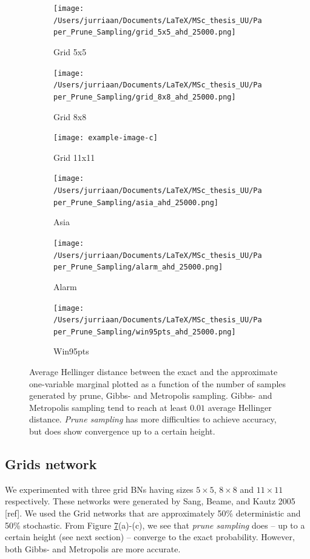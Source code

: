 \documentclass[a4paper, twoside, 11pt]{report}
\theoremstyle{plain}
\theoremstyle{definition}
\theoremstyle{remark}
\begin{document}
\begin{figure}[h!]
\centering
\begin{subfigure}{0.5\textwidth}
\texttt{[image: /Users/jurriaan/Documents/LaTeX/MSc\_thesis\_UU/Paper\_Prune\_Sampling/grid\_5x5\_ahd\_25000.png]}
\caption{Grid 5x5}%
\label{grid_5x5}%
\end{subfigure}\hfill%
\begin{subfigure}{0.5\textwidth}
\texttt{[image: /Users/jurriaan/Documents/LaTeX/MSc\_thesis\_UU/Paper\_Prune\_Sampling/grid\_8x8\_ahd\_25000.png]}
\caption{Grid 8x8}%
\label{grid_8x8}%
\end{subfigure}\hfill%

\begin{subfigure}{0.5\textwidth}
\texttt{[image: example-image-c]}
\caption{Grid 11x11}%
\label{grid_11x11}%
\end{subfigure}\hfill%
\begin{subfigure}{0.5\textwidth}
\texttt{[image: /Users/jurriaan/Documents/LaTeX/MSc\_thesis\_UU/Paper\_Prune\_Sampling/asia\_ahd\_25000.png]}
\caption{Asia}%
\label{asia}%
\end{subfigure}\hfill%

\begin{subfigure}{0.5\textwidth}
\texttt{[image: /Users/jurriaan/Documents/LaTeX/MSc\_thesis\_UU/Paper\_Prune\_Sampling/alarm\_ahd\_25000.png]}
\caption{Alarm}%
\label{alarm}%
\end{subfigure}\hfill%
\begin{subfigure}{0.5\textwidth}
\texttt{[image: /Users/jurriaan/Documents/LaTeX/MSc\_thesis\_UU/Paper\_Prune\_Sampling/win95pts\_ahd\_25000.png]}
\caption{Win95pts}%
\label{win95pts}%
\end{subfigure}\hfill%
\vspace{0.75pc}
\caption{Average Hellinger distance between the exact and the approximate one-variable marginal plotted as a function of the number of samples generated by prune, Gibbs- and Metropolis sampling. Gibbs- and Metropolis sampling tend to reach at least $0.01$ average Hellinger distance. \textit{Prune sampling} has more difficulties to achieve accuracy, but does show convergence up to a certain height. }
\label{results1}
\end{figure}



\subsection{Grids network}
We experimented with three grid BNs having sizes $5 \times 5$, $8 \times 8$ and $11 \times 11$ respectively. These networks were generated by Sang, Beame, and Kautz 2005 [ref]. We used the Grid networks that are approximately 50\% deterministic and 50\% stochastic. From Figure \ref{results1}(a)-(c), we see that \textit{prune sampling} does -- up to a certain height (see next section) -- converge to the exact probability. However, both Gibbs- and Metropolis are more accurate.
\end{document}
